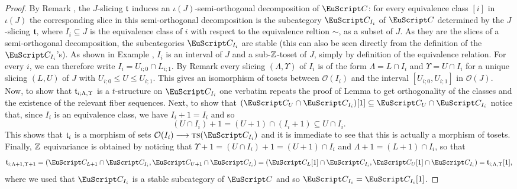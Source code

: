 \begin{proof}
By Remark , the $J$-slicing $\mathfrak{t}$ induces an $\iota(J)$-semi-orthogonal decomposition of $\C$: for every equivalence class $[i]$ in $\iota(J)$ the corresponding slice in this semi-orthogonal decomposition is the subcategory $\C_{I_i}$ of $\C$ determined by the $J$-slicing $\mathfrak{t}$, where $I_i\subseteq J$ is the equivalence class of $i$ with respect to the equivalence reltion $\sim$, as a subset of $J$. As they are the slices of a semi-orthogonal decomposition, the subcategories $\C_{I_i}$ are stable (this can also be seen directly from the definition of the $\C_{I_i}$'s).
 As shown in Example , $I_i$ is an interval of $J$ and a sub-$\mathbb{Z}$-toset of $J$, simply by definition of the equivalence relation. 
For every $i$, we can therefore write $I_i=U_{i;0}\cap L_{i;1}$. By Remark  every slicing $(\Lambda,\Upsilon)$ of $I_i$ is of the form $\Lambda=L\cap I_{i}$ and $\Upsilon=U\cap I_{i}$ for a unique slicing $(L,U)$ of $J$ with $U_{i;0}\leq U\leq U_{i;1}$. This gives an isomorphism of tosets between $\mathcal{O}(I_i)$ and the interval $[U_{i;0},U_{i;1}]$ in $\mathcal{O}(J)$.
Now, to show that $\mathfrak{t}_{i;\Lambda,\Upsilon}$ is a $t$-structure on $\C_{I_i}$ one verbatim repeats the proof of Lemma  to get orthogonality of the classes and the existence of the relevant fiber sequences. Next, to show that $(\C_U\cap \C_{I_i})[1]\subseteq \C_U\cap \C_{I_i}$ notice that, since $I_i$ is an equivalence class, we have $I_i+1=I_i$ and so 
\[
(U\cap I_{i})+1=(U+1)\cap (I_i+1)\subseteq U\cap I_i.
\]
This shows that $\mathfrak{t}_i$ is a morphism of sets $\mathcal{O}(I_i)\to \ts(\C_{I_i})$ and it is immediate to see that this is actually a morphism of tosets. Finally, $\mathbb{Z}$ equivariance is obtained by noticing that $\Upsilon+1=(U\cap I_i)+1=(U+1)\cap I_i$ and $\Lambda+1=(L+1)\cap I_i$, so that
\[
\tee_{i;\Lambda+1,\Upsilon+1}=(\C_{L+1}\cap \C_{I_i},\C_{U+1}\cap \C_{I_i})=(\C_L[1]\cap \C_{I_i},\C_U[1]\cap \C_{I_i})=\tee_{i;\Lambda,\Upsilon}[1],
\]
where we used that $\C_{I_i}$ is a stable subcategory of $\C$ and so $\C_{I_i}=\C_{I_i}[1]$.
\end{proof}

